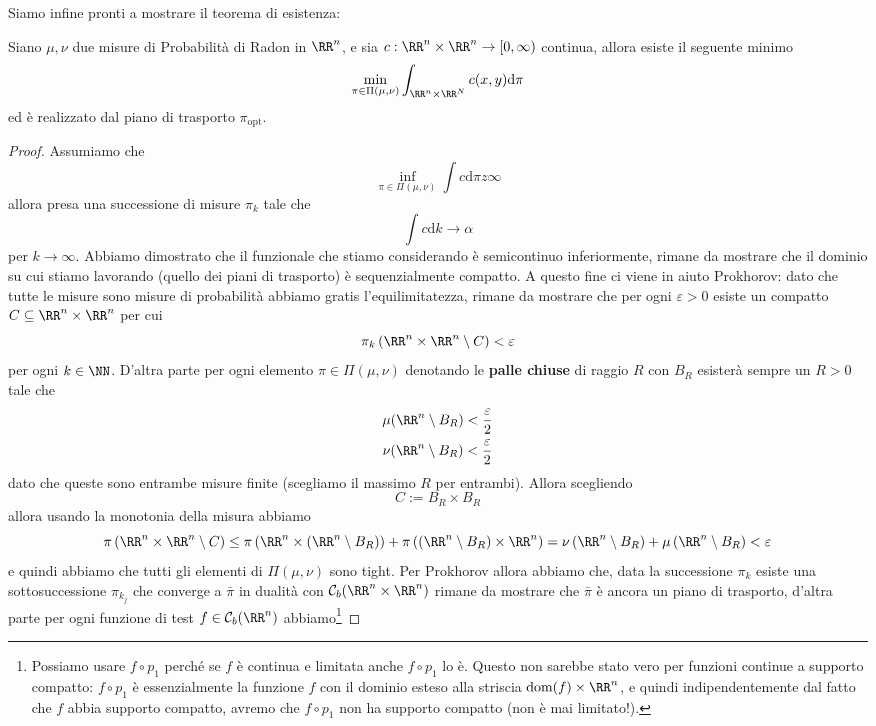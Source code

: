 \documentclass[11pt]{scrartcl}
\newcommand{\dif}{\text{d}}
\begin{document}
	Siamo infine pronti a mostrare il teorema di esistenza:
	\begin{theorem}
		Siano $\mu,\nu$ due misure di Probabilità di Radon in $\RR^n$, e sia $c:\RR^n\times\RR^n\to[0,\infty)$ continua, allora esiste il seguente minimo
		$$\min_{\pi\in \Pi(\mu,\nu)}\int_{\RR^n\times\RR^N}c(x,y)\dif \pi$$
		ed è realizzato dal piano di trasporto $\pi_\text{opt}$.
	\end{theorem}
	\begin{proof}
		Assumiamo che 
		$$\inf_{\pi\in\Pi(\mu,\nu)}\int c \dif \pi z\infty$$
		allora presa una successione di misure $\pi_k$ tale che
		$$\int c \dif k \to \alpha$$
		per $k\to\infty$. Abbiamo dimostrato che il funzionale che stiamo considerando è semicontinuo inferiormente, rimane da mostrare che il dominio su cui stiamo lavorando (quello dei piani di trasporto) è sequenzialmente compatto. A questo fine ci viene in aiuto Prokhorov: dato che tutte le misure sono misure di probabilità abbiamo gratis l'equilimitatezza, rimane da mostrare che per ogni $\varepsilon>0$ esiste un compatto $C\subseteq\RR^n\times\RR^n$ per cui
		$$\pi_k\left(\RR^n\times\RR^n\setminus C\right)<\varepsilon$$
		per ogni $k\in\NN$. D'altra parte per ogni elemento $\pi\in \Pi(\mu,\nu)$ denotando le \textbf{palle chiuse} di raggio $R$ con $B_R$ esisterà sempre un $R>0$ tale che
		\begin{gather*}
			\mu(\RR^n\setminus B_R) < \frac{\varepsilon}{2} \\
			\nu(\RR^n\setminus B_R) < \frac{\varepsilon}{2}
		\end{gather*} 
		dato che queste sono entrambe misure finite (scegliamo il massimo $R$ per entrambi). Allora scegliendo
		$$C:=B_R\times B_R$$
		allora usando la monotonia della misura abbiamo
		$$\pi\left(\RR^n\times \RR^n\setminus C\right)\le \pi\left(\RR^n\times\left(\RR^n\setminus B_R\right)\right)+\pi\left(\left(\RR^n\setminus B_R\right)\times \RR^n\right)=\nu\left(\RR^n\setminus B_R\right)+\mu\left(\RR^n\setminus B_R\right)< \varepsilon$$
		e quindi abbiamo che tutti gli elementi di $\Pi(\mu,\nu)$ sono tight. Per Prokhorov allora abbiamo che, data la successione $\pi_k$ esiste una sottosuccessione $\pi_{k_j}$ che converge a $\bar{\pi}$ in dualità con $\mathcal{C}_b(\RR^n\times\RR^n)$ rimane da mostrare che $\bar{\pi}$ è ancora un piano di trasporto, d'altra parte per ogni funzione di test $f\in \mathcal{C}_b(\RR^n)$ abbiamo\footnote{Possiamo usare $f\circ p_1$ perché se $f$ è continua e limitata anche $f\circ p_1$ lo è. Questo non sarebbe stato vero per funzioni continue a supporto compatto: $f\circ p_1$ è essenzialmente la funzione $f$ con il dominio esteso alla striscia $\text{dom}(f)\times \RR^n$, e quindi indipendentemente dal fatto che $f$ abbia supporto compatto, avremo che $f\circ p_1$ non ha supporto compatto (non è mai limitato!).}

\end{proof}
\end{document}

